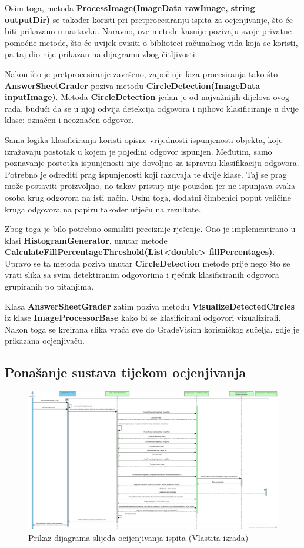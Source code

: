 \documentclass{foi}
\begin{document}
Osim toga, metoda \textbf{ProcessImage(ImageData rawImage, string outputDir)}  se također koristi pri pretprocesiranju ispita za ocjenjivanje, što će biti prikazano u nastavku.
Naravno, ove metode kasnije pozivaju svoje privatne pomoćne metode, što će uvijek ovisiti o biblioteci računalnog vida koja se koristi, pa taj dio nije prikazan na dijagramu zbog čitljivosti.

Nakon što je pretprocesiranje završeno, započinje faza procesiranja tako što \textbf{AnswerSheetGrader} poziva metodu \textbf{CircleDetection(ImageData inputImage)}. Metoda \textbf{CircleDetection} jedan je od najvažnijih dijelova ovog rada, budući da se u njoj odvija detekcija odgovora i njihovo klasificiranje u dvije klase: označen i neoznačen odgovor.

Sama logika klasificiranja koristi opisne vrijednosti ispunjenosti objekta, koje izražavaju postotak u kojem je pojedini odgovor ispunjen. Međutim, samo poznavanje postotka ispunjenosti nije dovoljno za ispravnu klasifikaciju odgovora. Potrebno je odrediti prag ispunjenosti koji razdvaja te dvije klase. Taj se prag može postaviti proizvoljno, no takav pristup nije pouzdan jer ne ispunjava svaka osoba krug odgovora na isti način. Osim toga, dodatni čimbenici poput veličine kruga odgovora na papiru također utječu na rezultate.

Zbog toga je bilo potrebno osmisliti preciznije rješenje. Ono je implementirano u klasi \textbf{HistogramGenerator}, unutar metode \textbf{CalculateFillPercentageThreshold(List<double> fillPercentages)}. Upravo se ta metoda poziva unutar \textbf{CircleDetection} metode prije nego što se vrati slika sa svim detektiranim odgovorima i rječnik klasificiranih odgovora grupiranih po pitanjima.

Klasa \textbf{AnswerSheetGrader} zatim poziva metodu \textbf{VisualizeDetectedCircles} iz klase \textbf{ImageProcessorBase} kako bi se klasificirani odgovori vizualizirali. Nakon toga se kreirana slika vraća sve do GradeVision korisničkog sučelja, gdje je prikazana ocjenjivaču. 

\subsection{Ponašanje sustava tijekom ocjenjivanja}

\begin{figure}[H]
\centering
\includegraphics[width=1.0\linewidth]{slike/sequence2.jpg}
\caption{Prikaz dijagrama slijeda ocijenjivanja ispita (Vlastita izrada)}
\end{figure}
\end{document}

